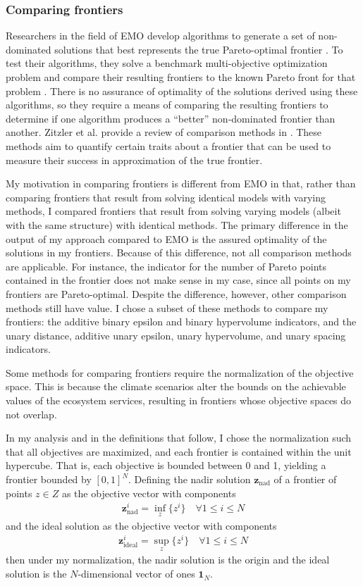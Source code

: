 \subsubsection{Comparing frontiers}
Researchers in the field of EMO develop algorithms to generate a set of non-dominated solutions that best represents the true Pareto-optimal frontier \cite{deb2001multi}. To test their algorithms, they solve a benchmark multi-objective optimization problem and compare their resulting frontiers to the known Pareto front for that problem \cite{knowles2002metrics}. There is no assurance of optimality of the solutions derived using these algorithms, so they require a means of comparing the resulting frontiers to determine if one algorithm produces a ``better'' non-dominated frontier than another. Zitzler et al. provide a review of comparison methods in \cite{zitzler2003performance}. These methods aim to quantify certain traits about a frontier that can be used to measure their success in approximation of the true frontier.

My motivation in comparing frontiers is different from EMO in that, rather than comparing frontiers that result from solving identical models with varying methods, I compared frontiers that result from solving varying models (albeit with the same structure) with identical methods. The primary difference in the output of my approach compared to EMO is the assured optimality of the solutions in my frontiers. Because of this difference, not all comparison methods are applicable. For instance, the indicator for the number of Pareto points contained in the frontier does not make sense in my case, since all points on my frontiers are Pareto-optimal. Despite the difference, however, other comparison methods still have value. I chose a subset of these methods to compare my frontiers: the additive binary epsilon and binary hypervolume indicators, and the unary distance, additive unary epsilon, unary hypervolume, and unary spacing indicators.

Some methods for comparing frontiers require the normalization of the objective space. This is because the climate scenarios alter the bounds on the achievable values of the ecosystem services, resulting in frontiers whose objective spaces do not overlap.

In my analysis and in the definitions that follow, I chose the normalization such that all objectives are maximized, and each frontier is contained within the unit hypercube. That is, each objective is bounded between 0 and 1, yielding a frontier bounded by $[0,1]^N$. Defining the nadir solution $\mathbf{z}_{\text{nad}}$ of a frontier of points $z \in Z$ as the objective vector with components
\begin{align}
\mathbf{z}_{\text{nad}}^i = \inf_{z} \{ z^i \} \quad \forall 1 \le i \le N
\end{align}
and the ideal solution as the objective vector with components
\begin{align}
\mathbf{z}_{\text{ideal}}^i = \sup_{z} \{ z^i \} \quad \forall 1 \le i \le N
\end{align}
then under my normalization, the nadir solution is the origin and the ideal solution is the $N$-dimensional vector of ones $\mathbf{1}_N$.

